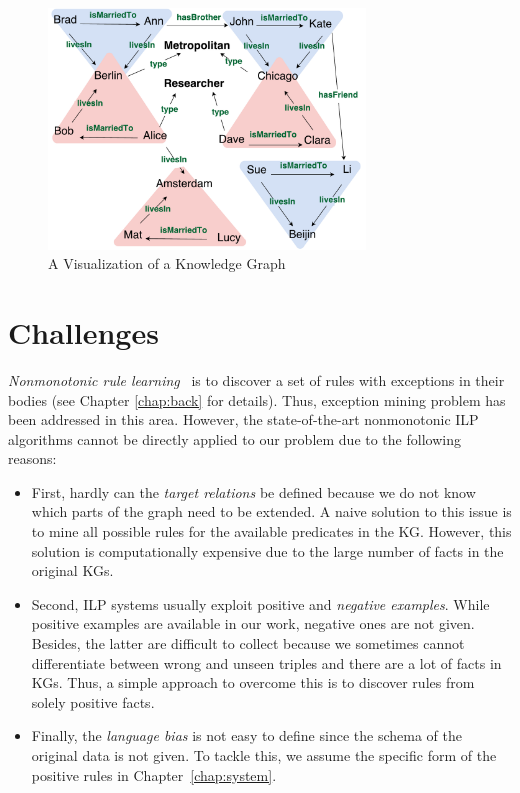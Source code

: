 \begin{figure}[t]
\centering
\includegraphics[width=0.75\textwidth]{figures/kg_advanced_col}
\caption{A Visualization of a Knowledge Graph}
\label{fig1.1}
\end{figure}

\section{Challenges}

\textit{Nonmonotonic rule learning}~\cite{ref11, ref40, ref41, ref32, ref42} is to discover a set of rules with exceptions in their bodies (see Chapter \ref{chap:back} for details). Thus, exception mining problem has been addressed in this area. However, the state-of-the-art nonmonotonic ILP algorithms cannot be directly applied to our problem due to the following reasons:
\begin{itemize}
\item First, hardly can the \textit{target relations} be defined because we do not know which parts of the graph need to be extended. A naive solution to this issue is to mine all possible rules for the available predicates in the KG. However, this solution is computationally expensive due to the large number of facts in the original KGs.
\item Second, ILP systems usually exploit positive and \textit{negative examples}. While positive examples are available in our work, negative ones are not given. Besides, the latter are difficult to collect because we sometimes cannot differentiate between wrong and unseen triples and there are a lot of facts in KGs. Thus, a simple approach to overcome this is to discover rules from solely positive facts.
\item Finally, the \textit{language bias} is not easy to define since the schema of the original data is not given. To tackle this, we assume the specific form of the positive rules in Chapter~\ref{chap:system}.
\end{itemize}

